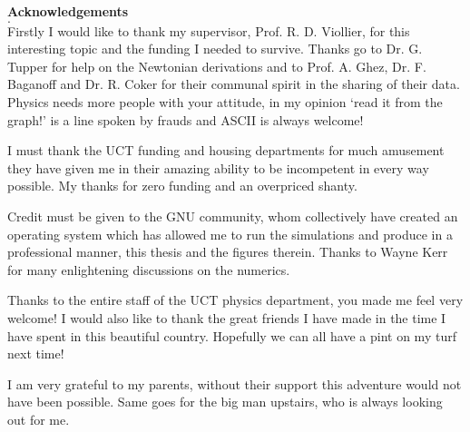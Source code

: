 \clearpage
\pagestyle{empty}
{\bf {\Large \noindent Acknowledgements}}
\\$\big.$\\ \noindent
Firstly I would like to thank my supervisor, Prof. R. D. Viollier, for this
interesting topic and the funding I needed to survive. Thanks go to Dr. G.
Tupper for help on the Newtonian derivations and to Prof. A. Ghez, Dr. F.
Baganoff and Dr. R. Coker for their communal spirit in the sharing of their
data. Physics needs more people with your attitude, in my opinion `read it from
the graph!' is a line spoken by frauds and ASCII is always welcome!

I must thank the UCT funding and housing departments for much amusement they
have given me in their amazing ability to be incompetent in every way possible.
My thanks for zero funding and an overpriced shanty.

Credit must be given to the GNU community, whom collectively have created an
operating system which has allowed me to run the simulations and produce in a
professional manner, this thesis and the figures therein. Thanks to Wayne Kerr
for many enlightening discussions on the numerics.

Thanks to the entire staff of the UCT physics department, you made me feel very
welcome! I would also like to thank the great friends I have made in the time I
have spent in this beautiful country. Hopefully we can all have a pint on my
turf next time!

I am very grateful to my parents, without their support this adventure would not
have been possible. Same goes for the big man upstairs, who is always looking
out for me.

\clearpage
